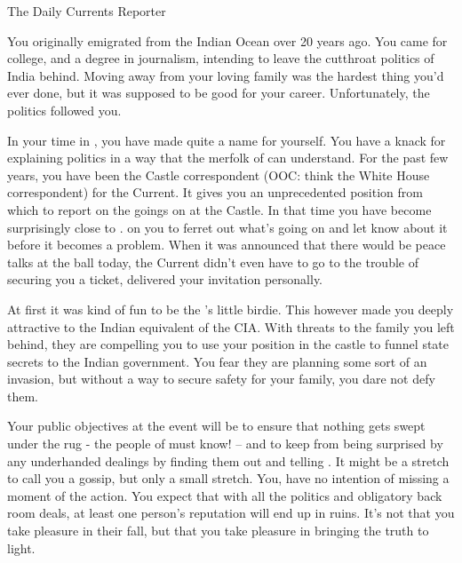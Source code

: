 \documentclass[char]{NeptuneBall}
\begin{document}
\name{\cReporter{}}

The Daily Currents Reporter

You originally emigrated from the Indian Ocean over 20 years ago. You came for college, and a degree in journalism, intending to leave the cutthroat politics of India behind. Moving away from your loving family was the hardest thing you'd ever done, but it was supposed to be good for your career. Unfortunately, the politics followed you.

In your time in \pAtlantis{}, you have made quite a name for yourself. You have a knack for explaining politics in a way that the merfolk of \pAtlantis{} can understand. For the past few years, you have been the Castle correspondent (OOC: think the White House correspondent) for the Current. It gives you an unprecedented position from which to report on the goings on at the Castle. In that time you have become surprisingly close to \cKing{\King} \cKing{}. \cKing{\They}  on you to ferret out what's going on and let \cKing{\them} know about it before it becomes a problem.  When it was announced that there would be peace talks at the ball today, the Current didn't even have to go to the trouble of securing you a ticket, \cKing{\King} \cKing{} delivered your invitation personally.

At first it was kind of fun to be the \cKing{\King}'s little birdie. This however made you deeply attractive to the Indian equivalent of the CIA. With threats to the family you left behind, they are compelling you to use your position in the castle to funnel state secrets to the Indian government. You fear they are planning some sort of an invasion, but without a way to secure safety for your family, you dare not defy them.

Your public objectives at the event will be to ensure that nothing gets swept under the rug - the people of \pAtlantis{} must know! -- and to keep \cKing{\King} \cKing{} from being surprised by any underhanded dealings by finding them out and telling \cKing{\them}. It might be a stretch to call you a gossip, but only a small stretch. You, have no intention of missing a moment of the action. You expect that with all the politics and obligatory back room deals, at least one person’s reputation will end up in ruins. It's not that you take pleasure in their fall, but that you take pleasure in bringing the truth to light.
\end{document}
